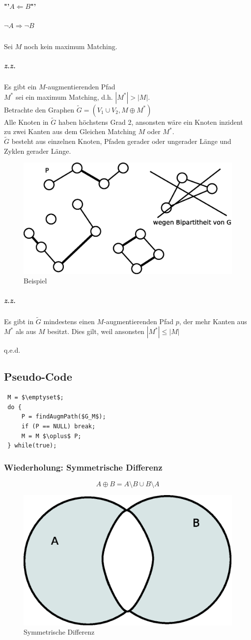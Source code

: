  \paragraph{"'$A\Leftarrow B$"'}
 \subparagraph{$\neg A \Rightarrow \neg B$}
 Sei $M$ noch kein maximum Matching.
 \subparagraph{z.z.} Es gibt ein $M$-augmentierenden Pfad\\
 $M^*$ sei ein maximum Matching, d.h. $|M^*| > |M|$.\\
 Betrachte den Graphen $\tilde{G} = (V_1\cup V_2, M\oplus M^*)$\\
 Alle Knoten in $\tilde{G}$ haben höchstens Grad 2, ansonsten wäre ein Knoten inzident zu zwei Kanten aus dem Gleichen Matching $M$ oder $M^*$.\\
 $\tilde{G}$ besteht aus einzelnen Knoten, Pfaden gerader oder ungerader Länge und Zyklen gerader Länge.
 \begin{figure}[H]
\centering
\includegraphics[width=0.3\linewidth]{23/Grafik/Diagramm7}
\caption{Beispiel}
\label{fig:Diagramm7}
\end{figure}

 \subparagraph{z.z.} Es gibt in $\tilde{G}$ mindestens einen $M$-augmentierenden Pfad $p$, der mehr Kanten aus $M^*$ als aus $M$ besitzt. Dies gilt, weil ansonsten $|M^*| \leq |M|$
 \begin{flushright}
 	q.e.d.
 \end{flushright}
 \subsection{Pseudo-Code}
 \begin{lstlisting}
 M = $\emptyset$;
 do {
	 P = findAugmPath($G_M$);
	 if (P == NULL) break;
	 M = M $\oplus$ P;
 } while(true);
 \end{lstlisting}
 \subsubsection{Wiederholung: Symmetrische Differenz}
 \[ A\oplus B = A\setminus B \cup B \setminus A \]
 \begin{figure}[H]
\centering
\includegraphics[width=0.3\linewidth]{23/Grafik/Diagramm9}
\caption{Symmetrische Differenz}
\label{fig:Diagramm9}
\end{figure}


